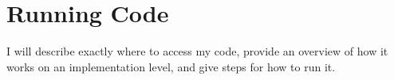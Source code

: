 \appendix
\renewcommand{\thechapter}{A}

\chapter{Running Code}

I will describe exactly where to access my code, provide an overview of how it works on an implementation level, and give steps for how to run it.


